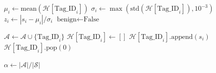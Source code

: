 \documentclass[10pt,journal,compsoc]{IEEEtran}
\begin{document}
\begin{algorithm}[H]
\begin{algorithmic}[1]
        \State $\mu_i \gets \text{mean}(\mathcal{H}[\text{Tag\_ID}_i])$
        \State $\sigma_i \gets \max(\text{std}(\mathcal{H}[\text{Tag\_ID}_i]), 10^{-3})$
        \State $z_i \gets |s_i - \mu_i| / \sigma_i$
         $\text{benign} \gets \text{False}$ 
        \EndIf
    \EndIf
    
        \State $\mathcal{A} \gets \mathcal{A} \cup \{\text{Tag\_ID}_i\}$
         $\mathcal{H}[\text{Tag\_ID}_i] \gets []$ \EndIf
        \State $\mathcal{H}[\text{Tag\_ID}_i].\text{append}(s_i)$
         $\mathcal{H}[\text{Tag\_ID}_i].\text{pop}(0)$ \EndIf
    \EndIf
\EndFor

\State $\alpha \gets |\mathcal{A}| / |\mathcal{S}|$ 
\end{algorithmic}
\end{algorithm}
\end{document}
